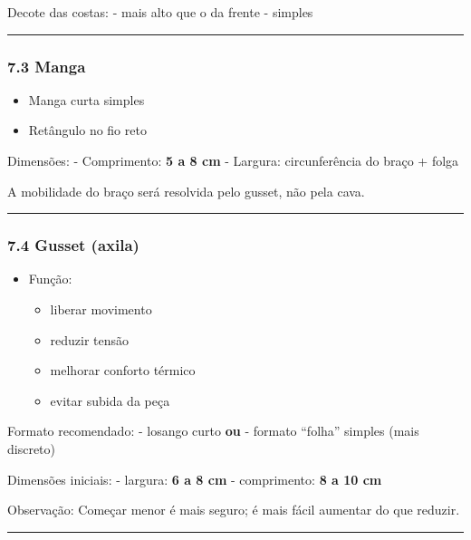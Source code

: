 \documentclass[
  10pt,oneside]{article}
\providecommand{\tightlist}{%
  \setlength{\itemsep}{0pt}\setlength{\parskip}{0pt}}
\begin{document}
Decote das costas:
- mais alto que o da frente
- simples

\begin{center}\rule{0.5\linewidth}{0.5pt}\end{center}

\subsubsection{7.3 Manga}\label{manga}

\begin{itemize}
\tightlist
\item
  Manga curta simples
\item
  Retângulo no fio reto
\end{itemize}

Dimensões:
- Comprimento: \textbf{5 a 8 cm}
- Largura: circunferência do braço + folga

A mobilidade do braço será resolvida pelo gusset, não pela cava.

\begin{center}\rule{0.5\linewidth}{0.5pt}\end{center}

\subsubsection{7.4 Gusset (axila)}\label{gusset-axila}

\begin{itemize}
\tightlist
\item
  Função:

  \begin{itemize}
  \tightlist
  \item
    liberar movimento
  \item
    reduzir tensão
  \item
    melhorar conforto térmico
  \item
    evitar subida da peça
  \end{itemize}
\end{itemize}

Formato recomendado:
- losango curto \textbf{ou}
- formato ``folha'' simples (mais discreto)

Dimensões iniciais:
- largura: \textbf{6 a 8 cm}
- comprimento: \textbf{8 a 10 cm}

Observação:
Começar menor é mais seguro; é mais fácil aumentar do que reduzir.

\begin{center}\rule{0.5\linewidth}{0.5pt}\end{center}
\end{document}
